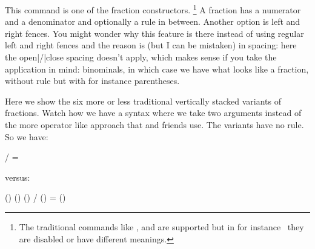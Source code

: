 This command is one of the fraction constructors. \footnote {The traditional
commands like ,  and  are supported but in for
instance \CONTEXT\ they are disabled or have different meanings.} A fraction has
a numerator and a denominator and optionally a rule in between. Another option is
left and right fences. You might wonder why this feature is there instead of
using regular left and right fences and the reason is (but I can be mistaken) in
spacing: here the open|/|close spacing doesn't apply, which makes sense if you
take the application in mind: binominals, in which case we have what looks like a
fraction, without rule but with for instance parentheses.

Here we show the six more or less traditional vertically stacked variants of
fractions. Watch how we have a syntax where we take two arguments instead of the
more operator like approach that  and friends use. The 
variants have no rule. So we have:

\starttabulate[|l|lT|lT|lT|l|]
    \NC \type{\Uabove}     \NC   \NC 1pt \NC {} \NC {}
    \NC \type{\Uatop}      \NC   \NC     \NC {} \NC {}
    \NC \type{\Uover}      \NC   \NC     \NC {} \NC {}
    \NC \type{\Uskewed}    \NC / \NC     \NC {} \NC {}
    \NC \type{\Ustretched} \NC = \NC     \NC {} \NC {}
\stoptabulate

versus:

\starttabulate[|l|lT|lT|lT|lT|l|]
    \NC \type{\Uabovewithdelims}     \NC   \NC () \NC 1pt \NC {} \NC {} \NC \NR \TB[medium]
    \NC \type{\Uatopwithdelims}      \NC   \NC () \NC     \NC {} \NC {} \NC \NR \TB[medium]
    \NC \type{\Uoverwithdelims}      \NC   \NC () \NC     \NC {} \NC {} \NC \NR \TB[medium]
    \NC \type{\Uskewedwithdelims}    \NC / \NC () \NC     \NC {} \NC {} \NC \NR \TB[medium]
    \NC \type{\Ustretchedwithdelims} \NC = \NC () \NC     \NC {} \NC {} \NC \NR
\stoptabulate

